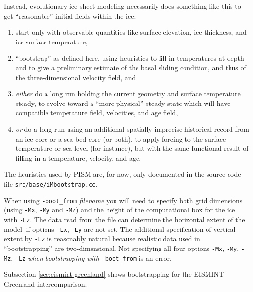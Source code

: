 \documentclass[titlepage,letterpaper,final]{scrartcl}
\newcommand{\txtopt}[2]{\texttt{-#1} #2\optindex{\texttt{-#1} #2}}
\newcommand{\fileopt}[1]{\txtopt{#1}{\emph{filename}}}
\begin{document}
Instead, evolutionary ice sheet modeling necessarily does something like this to get ``reasonable'' initial fields within the ice: \begin{enumerate}
\item start only with observable quantities like surface elevation, ice thickness, and ice surface temperature,
\item ``bootstrap'' as defined here, using heuristics to fill in temperatures at depth and to give a preliminary estimate of the basal sliding condition, and thus of the three-dimensional velocity field, and
\item \emph{either} do a long run holding the current geometry and surface temperature steady,  to evolve toward a ``more physical'' steady state which will have compatible temperature field, velocities, and age field,
\item \emph{or} do a long run using an additional spatially-imprecise historical record from an ice core or a sea bed core (or both), to apply forcing to the surface temperature or sea level (for instance), but with the same functional result of filling in a temperature, velocity, and age.
\end{enumerate}

The heuristics used by PISM are, for now, only documented in the source code file \texttt{src/base/iMbootstrap.cc}.

When using \fileopt{boot_from} you will need to specify both grid dimensions (using \texttt{-Mx}, \texttt{-My} and \texttt{-Mz}) and the height of the computational box for the ice with \texttt{-Lz}.  The data read from the file can determine the horizontal extent of the model, if options \texttt{-Lx}, \texttt{-Ly} are not set.  The additional specification of vertical extent by \texttt{-Lz} is reasonably natural because realistic data used in ``bootstrapping'' are two-dimensional.  Not specifying all four options \texttt{-Mx}, \texttt{-My}, \texttt{-Mz}, \texttt{-Lz} \emph{when bootstrapping with} \texttt{-boot_from} is an error.

Subsection \ref{sec:eismint-greenland} shows bootstrapping for the EISMINT-Greenland intercomparison.
\end{document}
